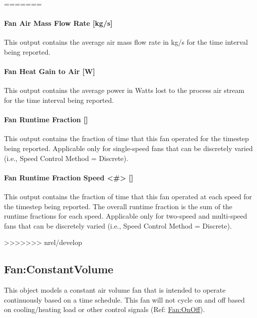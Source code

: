 =======
\paragraph{Fan Air Mass Flow Rate {[}kg/s{]}}\label{fan-air-mass-flow-fansysmodel}

This output contains the average air mass flow rate in kg/s for the time interval being reported.

\paragraph{Fan Heat Gain to Air {[}W{]}}\label{fan-heat-gain-to-air-fansysmodel}

This output contains the average power in Watts lost to the process air stream for the time interval being reported.

\paragraph{Fan Runtime Fraction {[]}}\label{fan-runtime-fraction-fansysmodel}

This output contains the fraction of time that this fan operated for the timestep being reported. Applicable only for single-speed fans that can be discretely varied (i.e., Speed Control Method = Discrete).

\paragraph{Fan Runtime Fraction Speed <\#> {[]}}\label{fan-runtime-fraction-speed-fansysmodel}

This output contains the fraction of time that this fan operated at each speed for the timestep being reported. The overall runtime fraction is the sum of the runtime fractions for each speed. Applicable only for two-speed and multi-speed fans that can be discretely varied (i.e., Speed Control Method = Discrete).

>>>>>>> nrel/develop
\subsection{Fan:ConstantVolume}\label{fanconstantvolume}

This object models a constant air volume fan that is intended to operate continuously based on a time schedule. This fan will not cycle on and off based on cooling/heating load or other control signals (Ref: \hyperref[fanonoff]{Fan:OnOff}).

